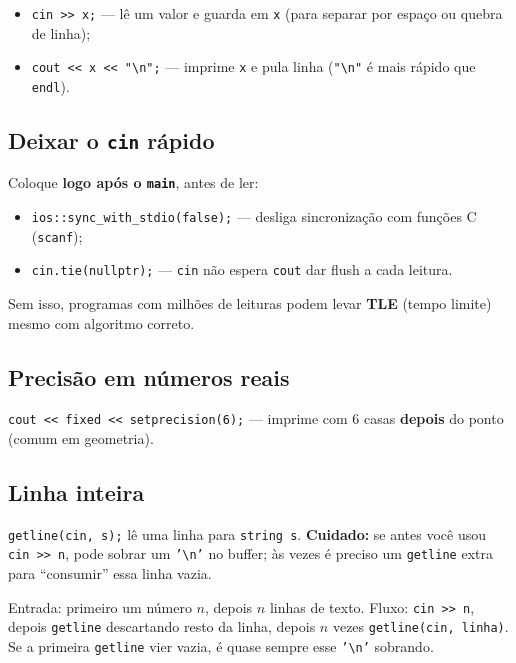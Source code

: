 \begin{itemize}[nosep]
  \item \texttt{cin >> x;} --- lê um valor e guarda em \texttt{x} (para separar por espaço ou quebra de linha);
  \item \texttt{cout << x << "\textbackslash n";} --- imprime \texttt{x} e pula linha (\texttt{"\textbackslash n"} é mais rápido que \texttt{endl}).
\end{itemize}

\subsection{Deixar o \texttt{cin} rápido}

Coloque \textbf{logo após o \texttt{main}}, antes de ler:

\begin{itemize}[nosep]
  \item \texttt{ios::sync\_with\_stdio(false);} --- desliga sincronização com funções C (\texttt{scanf});
  \item \texttt{cin.tie(nullptr);} --- \texttt{cin} não espera \texttt{cout} dar flush a cada leitura.
\end{itemize}

Sem isso, programas com milhões de leituras podem levar \textbf{TLE} (tempo limite) mesmo com algoritmo correto.

\subsection{Precisão em números reais}

\texttt{cout << fixed << setprecision(6);} --- imprime com 6 casas \textbf{depois} do ponto (comum em geometria).

\subsection{Linha inteira}

\texttt{getline(cin, s);} lê uma linha para \texttt{string s}. \textbf{Cuidado:} se antes você usou \texttt{cin >> n}, pode sobrar um \texttt{'\textbackslash n'} no buffer; às vezes é preciso um \texttt{getline} extra para ``consumir'' essa linha vazia.

\begin{exemplodiabox}
Entrada: primeiro um número $n$, depois $n$ linhas de texto. Fluxo: \texttt{cin >> n}, depois \texttt{getline} descartando resto da linha, depois $n$ vezes \texttt{getline(cin, linha)}. Se a primeira \texttt{getline} vier vazia, é quase sempre esse \texttt{'\textbackslash n'} sobrando.
\end{exemplodiabox}

